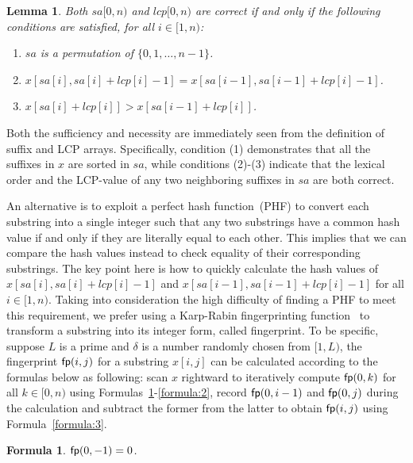 \documentclass[10pt,journal,compsoc]{IEEEtran}
\newtheorem{Formula}{Formula}
\newtheorem{Lemma}{Lemma}
\begin{document}
\begin{Lemma} \label{lemma:1}
	Both $sa[0, n)$ and $lcp[0, n)$ are correct if and only if the following conditions are satisfied, for all $i \in [1, n)$:
	\begin{enumerate}[(1)]
		\item
		$sa$ is a permutation of $\{0, 1, \dots, n - 1\}$.
		\item
		$x[sa[i], sa[i] + lcp[i] - 1] = x[sa[i - 1], sa[i - 1] + lcp[i] - 1]$.
		\item
		$x[sa[i] + lcp[i]] > x[sa[i - 1] + lcp[i]]$. 	
	\end{enumerate}
\end{Lemma}

\begin{IEEEproof}
	Both the sufficiency and necessity are immediately seen from the definition of suffix and LCP arrays. Specifically, condition (1) demonstrates that all the suffixes in $x$ are sorted in $sa$, while conditions (2)-(3) indicate that the lexical order and the LCP-value of any two neighboring suffixes in $sa$ are both correct.
\end{IEEEproof}

An alternative is to exploit a perfect hash function~(PHF) to convert each substring into a single integer such that any two substrings have a common hash value if and only if they are literally equal to each other. This implies that we can compare the hash values instead to check equality of their corresponding substrings. The key point here is how to quickly calculate the hash values of $x[sa[i], sa[i] + lcp[i] - 1]$ and $x[sa[i - 1], sa[i - 1] + lcp[i] - 1]$ for all $i \in [1, n)$. Taking into consideration the high difficulty of finding a PHF to meet this requirement, we prefer using a Karp-Rabin fingerprinting function~\cite{Karp1987} to transform a substring into its integer form, called fingerprint. To be specific, suppose $L$ is a prime and $\delta$ is a number randomly chosen from $[1, L)$, the fingerprint ${\sf fp}(i, j)$ for a substring $x[i, j]$ can be calculated according to the formulas below as following: scan $x$ rightward to iteratively compute ${\sf fp}(0, k)$ for all $k \in [0, n)$ using Formulas~\ref{formula:1}-\ref{formula:2}, record ${\sf fp}(0, i - 1)$ and ${\sf fp}(0, j)$ during the calculation and subtract the former from the latter to obtain ${\sf fp}(i, j)$ using Formula~\ref{formula:3}.

\begin{Formula} \label{formula:1}
	${\sf fp}(0, -1) = 0$.
	
\end{Formula}
\end{document}
